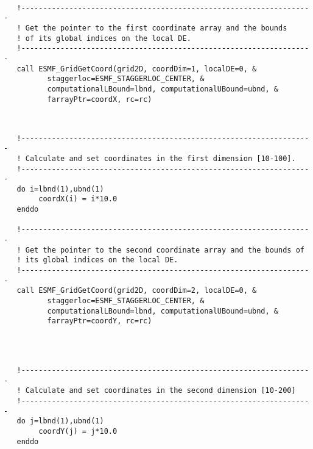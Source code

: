 
 \begin{verbatim}

   !-------------------------------------------------------------------
   ! Get the pointer to the first coordinate array and the bounds
   ! of its global indices on the local DE.
   !-------------------------------------------------------------------
   call ESMF_GridGetCoord(grid2D, coordDim=1, localDE=0, &
          staggerloc=ESMF_STAGGERLOC_CENTER, &
          computationalLBound=lbnd, computationalUBound=ubnd, &
          farrayPtr=coordX, rc=rc)
 
\end{verbatim}
 

 \begin{verbatim}

   !-------------------------------------------------------------------
   ! Calculate and set coordinates in the first dimension [10-100].
   !-------------------------------------------------------------------
   do i=lbnd(1),ubnd(1)
        coordX(i) = i*10.0
   enddo

   !-------------------------------------------------------------------
   ! Get the pointer to the second coordinate array and the bounds of
   ! its global indices on the local DE.
   !-------------------------------------------------------------------
   call ESMF_GridGetCoord(grid2D, coordDim=2, localDE=0, &
          staggerloc=ESMF_STAGGERLOC_CENTER, &
          computationalLBound=lbnd, computationalUBound=ubnd, &
          farrayPtr=coordY, rc=rc)
 
\end{verbatim}
 

 \begin{verbatim}


   !-------------------------------------------------------------------
   ! Calculate and set coordinates in the second dimension [10-200]
   !-------------------------------------------------------------------
   do j=lbnd(1),ubnd(1)
        coordY(j) = j*10.0
   enddo
 
\end{verbatim}
 

